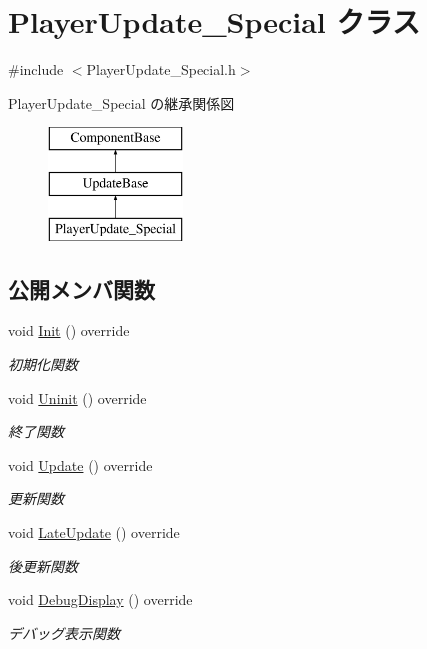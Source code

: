 \hypertarget{class_player_update___special}{}\section{Player\+Update\+\_\+\+Special クラス}
\label{class_player_update___special}


{\ttfamily \#include $<$Player\+Update\+\_\+\+Special.\+h$>$}

Player\+Update\+\_\+\+Special の継承関係図\begin{figure}[H]
\begin{center}
\leavevmode
\includegraphics[height=3.000000cm]{class_player_update___special}
\end{center}
\end{figure}
\subsection*{公開メンバ関数}
\begin{DoxyCompactItemize}
\item 
void \mbox{\hyperlink{class_player_update___special_a48906da6915325d92d5cc6ec67212259}{Init}} () override
\begin{DoxyCompactList}\small\item\em 初期化関数 \end{DoxyCompactList}\item 
void \mbox{\hyperlink{class_player_update___special_a60b5982ed56b52293a9e651ae7bf305f}{Uninit}} () override
\begin{DoxyCompactList}\small\item\em 終了関数 \end{DoxyCompactList}\item 
void \mbox{\hyperlink{class_player_update___special_afef3503e292dbaded809068fd87deadd}{Update}} () override
\begin{DoxyCompactList}\small\item\em 更新関数 \end{DoxyCompactList}\item 
void \mbox{\hyperlink{class_player_update___special_a1daae8fdcd87bf907313a98e022f254c}{Late\+Update}} () override
\begin{DoxyCompactList}\small\item\em 後更新関数 \end{DoxyCompactList}\item 
void \mbox{\hyperlink{class_player_update___special_a6253000b53b2c5bc73ce0ed4d3b4a82a}{Debug\+Display}} () override
\begin{DoxyCompactList}\small\item\em デバッグ表示関数 \end{DoxyCompactList}\end{DoxyCompactItemize}


